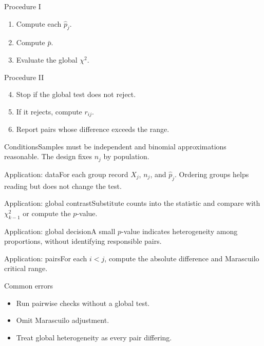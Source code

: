 \documentclass[10pt,aspectratio=169]{beamer}
\begin{document}
\begin{frame}{Procedure I}\small\begin{enumerate}\item Compute each $\hat p_j$.\item Compute $\bar p$.\item Evaluate the global $\chi^2$.\end{enumerate}\end{frame}
\begin{frame}{Procedure II}\small\begin{enumerate}\setcounter{enumi}{3}\item Stop if the global test does not reject.\item If it rejects, compute $r_{ij}$.\item Report pairs whose difference exceeds the range.\end{enumerate}\end{frame}
\begin{frame}{Conditions}\small Samples must be independent and binomial approximations reasonable. The design fixes $n_j$ by population.\end{frame}
\begin{frame}{Application: data}\small For each group record $X_j$, $n_j$, and $\hat p_j$. Ordering groups helps reading but does not change the test.\end{frame}
\begin{frame}{Application: global contrast}\small Substitute counts into the statistic and compare with $\chi^2_{k-1}$ or compute the $p$-value.\end{frame}
\begin{frame}{Application: global decision}\small A small $p$-value indicates heterogeneity among proportions, without identifying responsible pairs.\end{frame}
\begin{frame}{Application: pairs}\small For each $i<j$, compute the absolute difference and Marascuilo critical range.\end{frame}
\begin{frame}{Common errors}\small\begin{itemize}\item Run pairwise checks without a global test.\item Omit Marascuilo adjustment.\item Treat global heterogeneity as every pair differing.\end{itemize}\end{frame}
\end{document}
